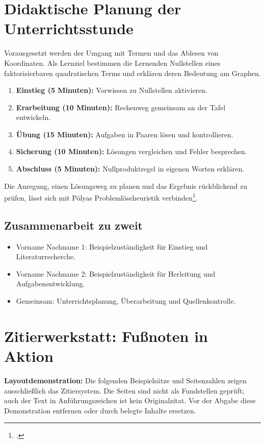 \documentclass[12pt,a4paper,ngerman]{scrartcl}
\theoremstyle{definition}
\newcommand{\personA}{Vorname Nachname 1}
\newcommand{\personB}{Vorname Nachname 2}
\begin{document}
\section{Didaktische Planung der Unterrichtsstunde}
Vorausgesetzt werden der Umgang mit Termen und das Ablesen von Koordinaten.
Als Lernziel bestimmen die Lernenden Nullstellen eines faktorisierbaren
quadratischen Terms und erklären deren Bedeutung am Graphen.
\begin{enumerate}
  \item \textbf{Einstieg (5 Minuten):} Vorwissen zu Nullstellen aktivieren.
  \item \textbf{Erarbeitung (10 Minuten):} Rechenweg gemeinsam an der Tafel entwickeln.
  \item \textbf{Übung (15 Minuten):} Aufgaben in Paaren lösen und kontrollieren.
  \item \textbf{Sicherung (10 Minuten):} Lösungen vergleichen und Fehler besprechen.
  \item \textbf{Abschluss (5 Minuten):} Nullproduktregel in eigenen Worten erklären.
\end{enumerate}
Die Anregung, einen Lösungsweg zu planen und das Ergebnis rückblickend zu prüfen,
lässt sich mit Pólyas Problemlöseheuristik verbinden\footcite{polya1945}.

\subsection{Zusammenarbeit zu zweit}
\begin{itemize}
  \item \personA: Beispielzuständigkeit für Einstieg und Literaturrecherche.
  \item \personB: Beispielzuständigkeit für Herleitung und Aufgabenentwicklung.
  \item Gemeinsam: Unterrichtsplanung, Überarbeitung und Quellenkontrolle.
\end{itemize}

\clearpage
\section{Zitierwerkstatt: Fußnoten in Aktion}
\label{sec:zitierdemo}
\textbf{Layoutdemonstration:} Die folgenden Beispielsätze und Seitenzahlen
zeigen ausschließlich das Zitiersystem. Die Seiten sind nicht als Fundstellen
geprüft; auch der Text in Anführungszeichen ist kein Originalzitat.
Vor der Abgabe diese Demonstration entfernen oder durch belegte Inhalte ersetzen.
\end{document}
